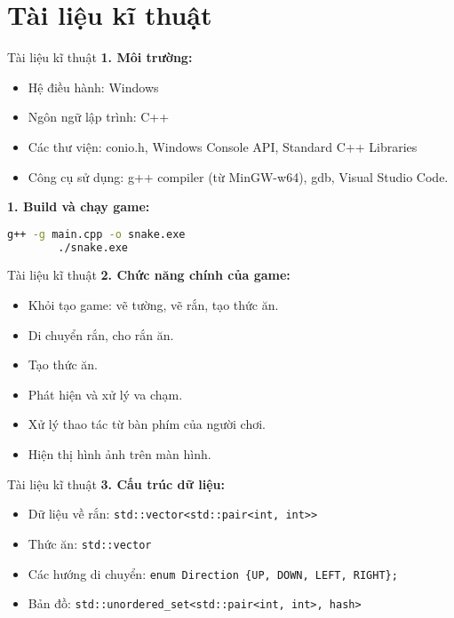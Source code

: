 \documentclass{beamer}
\begin{document}
\section{Tài liệu kĩ thuật}
\begin{frame}[fragile]{Tài liệu kĩ thuật}
    \textbf{1. Môi trường:}
    \begin{itemize}
        \item Hệ điều hành: Windows
        \item Ngôn ngữ lập trình: C++
        \item Các thư viện: conio.h, Windows Console API, Standard C++ Libraries
        \item Công cụ sử dụng: g++ compiler (từ MinGW-w64), gdb, Visual Studio Code.
    \end{itemize}
    \textbf{1. Build và chạy game:}
    \begin{lstlisting}[language=bash]
        g++ -g main.cpp -o snake.exe
        ./snake.exe
    \end{lstlisting}
\end{frame}

\begin{frame}{Tài liệu kĩ thuật}
    \textbf{2. Chức năng chính của game:}
    \begin{itemize}
        \item Khỏi tạo game: vẽ tường, vẽ rắn, tạo thức ăn.
        \item Di chuyển rắn, cho rắn ăn.
        \item Tạo thức ăn.
        \item Phát hiện và xử lý va chạm.
        \item Xử lý thao tác từ bàn phím của người chơi.
        \item Hiện thị hình ảnh trên màn hình.
    \end{itemize}
\end{frame}

\begin{frame}{Tài liệu kĩ thuật}
    \textbf{3. Cấu trúc dữ liệu:}
    \begin{itemize}
        \item Dữ liệu về rắn: \texttt{std::vector<std::pair<int, int>>}
        \item Thức ăn: \texttt{std::vector}
        \item Các hướng di chuyển: \texttt{enum Direction \{UP, DOWN, LEFT, RIGHT\};}
        \item Bản đồ: \texttt{std::unordered\_set<std::pair<int, int>, hash>}
    \end{itemize}
\end{frame}
\end{document}
